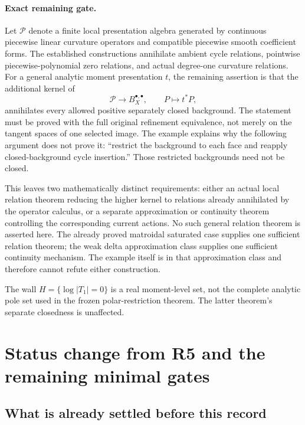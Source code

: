 \documentclass[11pt,a4paper]{article}
\numberwithin{equation}{section}
\theoremstyle{definition}
\theoremstyle{remark}
\begin{document}
\paragraph{Exact remaining gate.}
Let $\mathscr P$ denote a finite local presentation algebra generated
by continuous piecewise linear curvature operators and compatible
piecewise smooth coefficient forms. The established constructions
annihilate ambient cycle relations, pointwise piecewise-polynomial
zero relations, and actual degree-one curvature relations. For a
general analytic moment presentation $t$, the remaining assertion is
that the additional kernel of
\[
        \mathscr P\longrightarrow B_X^{\bullet,\bullet},
        \qquad P\longmapsto t^*P,
\]
annihilates every allowed positive separately closed background.
The statement must be proved with the full original refinement
equivalence, not merely on the tangent spaces of one selected image.
The example explains why the following argument does not prove it:
``restrict the background to each face and reapply closed-background
cycle insertion.'' Those restricted backgrounds need not be closed.

This leaves two mathematically distinct requirements: either an actual
local relation theorem reducing the higher kernel to relations already
annihilated by the operator calculus, or a separate approximation or
continuity theorem controlling the corresponding current actions.
No such general relation theorem is asserted here. The already proved
matroidal saturated case supplies one sufficient relation theorem;
the weak delta approximation class supplies one sufficient continuity
mechanism. The example itself is in that approximation class and
therefore cannot refute either construction.

The wall $H=\{\log|T_1|=0\}$ is a real moment-level set, not the
complete analytic pole set used in the frozen polar-restriction
theorem. The latter theorem's separate closedness is unaffected.



\section{Status change from R5 and the remaining minimal gates}
\label{sec:r6-status}

\subsection{What is already settled before this record}
\end{document}
